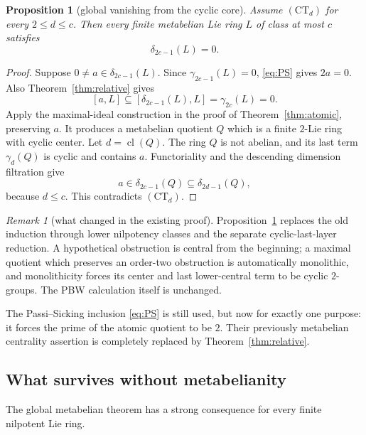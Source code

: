 \documentclass[a4paper,11pt,reqno]{amsart}
\newtheorem{proposition}[theorem]{Proposition}
\theoremstyle{definition}
\theoremstyle{remark}
\newtheorem{remark}[theorem]{Remark}
\newcommand{\dlt}{\delta}
\newcommand{\gm}{\gamma}
\newcommand{\cl}{\operatorname{cl}}
\begin{document}
\begin{proposition}[global vanishing from the cyclic core]
\label{prop:short-metabelian}
Assume $(\mathrm{CT}_d)$ for every $2\leq d\leq c$.  Then every finite
metabelian Lie ring $L$ of class at most $c$ satisfies
\begin{equation}\label{eq:global-metabelian}
                         \dlt_{2c-1}(L)=0.
\end{equation}
\end{proposition}

\begin{proof}
Suppose $0\ne a\in\dlt_{2c-1}(L)$.  Since
$\gm_{2c-1}(L)=0$, \eqref{eq:PS} gives $2a=0$.  Also
Theorem~\ref{thm:relative} gives
\[
 [a,L]\subseteq[\dlt_{2c-1}(L),L]=\gm_{2c}(L)=0.
\]
Apply the maximal-ideal construction in the proof of
Theorem~\ref{thm:atomic}, preserving $a$.  It produces a metabelian quotient
$Q$ which is a finite $2$-Lie ring with cyclic center.  Let
$d=\cl(Q)$.  The ring $Q$ is not abelian, and its last term
$\gm_d(Q)$ is cyclic and contains $a$.  Functoriality and the descending
dimension filtration give
\[
        a\in\dlt_{2c-1}(Q)\subseteq\dlt_{2d-1}(Q),
\]
because $d\leq c$.  This contradicts $(\mathrm{CT}_d)$.
\end{proof}

\begin{remark}[what changed in the existing proof]
Proposition~\ref{prop:short-metabelian} replaces the old induction through
lower nilpotency classes and the separate cyclic-last-layer reduction.  A
hypothetical obstruction is central from the beginning; a maximal quotient
which preserves an order-two obstruction is automatically monolithic, and
monolithicity forces its center and last lower-central term to be cyclic
$2$-groups.  The PBW calculation itself is unchanged.

The Passi--Sicking inclusion \eqref{eq:PS} is still used, but now for exactly
one purpose: it forces the prime of the atomic quotient to be $2$.  Their
previously metabelian centrality assertion is completely replaced by
Theorem~\ref{thm:relative}.
\end{remark}

\subsection{What survives without metabelianity}

The global metabelian theorem has a strong consequence for every finite
nilpotent Lie ring.
\end{document}

